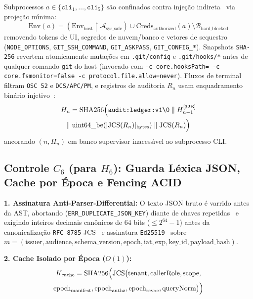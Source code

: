 \documentclass[10pt,twocolumn]{article}
\begin{document}
Subprocessos $a \in \{\texttt{cli}_1, \dots, \texttt{cli}_5\}$ s\~{a}o confinados contra inje\c{c}\~{a}o indireta~\cite{R22,R25} via proje\c{c}\~{a}o m\'{\i}nima:
\begin{equation}
\mathrm{Env}(a) = \left(\mathrm{Env}_{\mathrm{host}} \upharpoonright \mathcal{A}_{\mathrm{sys\_safe}}\right) \cup \mathrm{Creds}_{\mathrm{authorized}}(a) \setminus \mathcal{B}_{\mathrm{hard\_blocked}}
\end{equation}
removendo tokens de UI, segredos de nuvem/banco e vetores de sequestro (\texttt{NODE\_OPTIONS}, \texttt{GIT\_SSH\_COMMAND}, \texttt{GIT\_ASKPASS}, \texttt{GIT\_CONFIG\_*}). Snapshots \texttt{SHA-256} revertem atomicamente muta\c{c}\~{o}es em \texttt{.git/config} e \texttt{.git/hooks/*} antes de qualquer comando \texttt{git} do host (invocado com \texttt{-c core.hooksPath= -c core.fsmonitor=false -c protocol.file.allow=never}). Fluxos de terminal filtram \texttt{OSC 52} e \texttt{DCS/APC/PM}, e registros de auditoria $R_n$ usam enquadramento bin\'{a}rio injetivo~\cite{R04}:
\begin{multline}
H_n = \mathrm{SHA256}\Bigl(\texttt{audit:ledger:v1\textbackslash 0} \parallel H_{n-1}^{[32\text{B}]} \\
\parallel \mathrm{uint64\_be}\!\left(\lvert \mathrm{JCS}(R_n) \rvert_{\mathrm{bytes}}\right) \parallel \mathrm{JCS}(R_n)\Bigr)
\end{multline}
ancorando $(n, H_n)$ em banco supervisor inacess\'{\i}vel ao subprocesso CLI.

\subsection{Controle $C_6$ (para $H_6$): Guarda L\'{e}xica JSON, Cache por \'{E}poca e Fencing ACID}

\textbf{1. Assinatura Anti-Parser-Differential:} O texto JSON bruto \'{e} varrido antes da AST, abortando (\texttt{ERR\_DUPLICATE\_JSON\_KEY}) diante de chaves repetidas~\cite{R12,R19} e exigindo inteiros decimais can\^{o}nicos de 64 bits ($\le 2^{64}-1$) antes da canonicaliza\c{c}\~{a}o \texttt{RFC 8785} JCS~\cite{R17} e assinatura \texttt{Ed25519}~\cite{R11} sobre $m = (\mathrm{issuer}, \mathrm{audience}, \mathrm{schema\_version}, \mathrm{epoch}, \mathrm{iat}, \mathrm{exp}, \mathrm{key\_id}, \mathrm{payload\_hash})$.

\textbf{2. Cache Isolado por \'{E}poca ($O(1)$):}
\begin{multline}
K_{\mathrm{cache}} = \mathrm{SHA256}\Bigl(\mathrm{JCS}\bigl(\mathrm{tenant}, \mathrm{callerRole}, \mathrm{scope},\\
\mathrm{epoch}_{\mathrm{manifest}}, \mathrm{epoch}_{\mathrm{authz}}, \mathrm{epoch}_{\mathrm{revoc}}, \mathrm{queryNorm}\bigr)\Bigr)
\end{multline}
\end{document}
